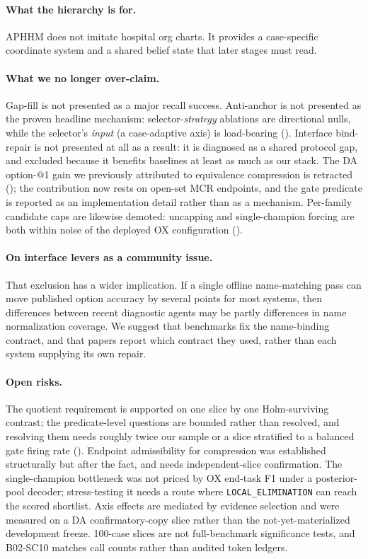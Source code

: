 \paragraph{What the hierarchy is for.}
APHHM does not imitate hospital org charts.
It provides a case-specific coordinate system and a shared belief state that later stages must read.

\paragraph{What we no longer over-claim.}
Gap-fill is not presented as a major recall success.
Anti-anchor is not presented as the proven headline mechanism: selector-\emph{strategy} ablations are directional nulls, while the selector's \emph{input} (a case-adaptive axis) is load-bearing ().
Interface bind-repair is not presented at all as a result: it is diagnosed as a shared protocol gap, and excluded because it benefits baselines at least as much as our stack.
The DA option-@1 gain we previously attributed to equivalence compression is retracted (); the contribution now rests on open-set MCR endpoints, and the gate predicate is reported as an implementation detail rather than as a mechanism.
Per-family candidate caps are likewise demoted: uncapping and single-champion forcing are both within noise of the deployed OX configuration ().

\paragraph{On interface levers as a community issue.}
That exclusion has a wider implication.
If a single offline name-matching pass can move published option accuracy by several points for most systems, then differences between recent diagnostic agents may be partly differences in name normalization coverage.
We suggest that benchmarks fix the name-binding contract, and that papers report which contract they used, rather than each system supplying its own repair.

\paragraph{Open risks.}
The quotient requirement is supported on one slice by one Holm-surviving contrast; the predicate-level questions are bounded rather than resolved, and resolving them needs roughly twice our sample or a slice stratified to a balanced gate firing rate ().
Endpoint admissibility for compression was established structurally but after the fact, and needs independent-slice confirmation.
The single-champion bottleneck was not priced by OX end-task F1 under a posterior-pool decoder; stress-testing it needs a route where \texttt{LOCAL\_ELIMINATION} can reach the scored shortlist.
Axis effects are mediated by evidence selection and were measured on a DA confirmatory-copy slice rather than the not-yet-materialized development freeze.
100-case slices are not full-benchmark significance tests, and B02-SC10 matches call counts rather than audited token ledgers.

